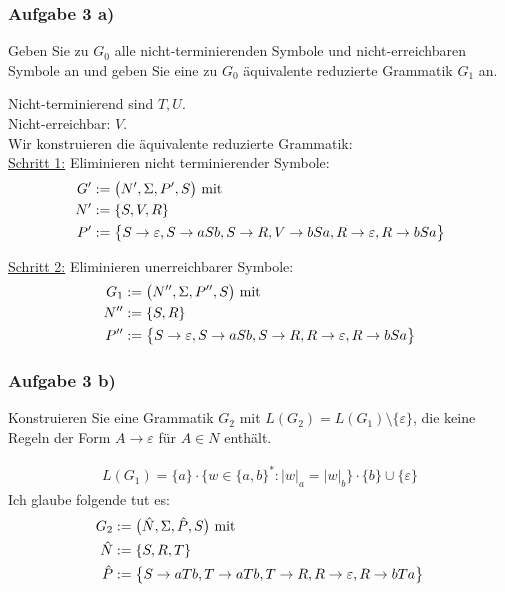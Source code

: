 \subsubsection{Aufgabe 3 a)}
Geben Sie zu $G_0$ alle nicht-terminierenden Symbole und nicht-erreichbaren Symbole an und geben Sie eine zu $G_0$ äquivalente reduzierte Grammatik $G_1$ an.

\begin{lösung}
	Nicht-terminierend sind $T,U$.\\
	Nicht-erreichbar: $V$.\\
	Wir konstruieren die äquivalente reduzierte Grammatik:\\
	\underline{Schritt 1:} Eliminieren nicht terminierender Symbole:
	\begin{align*}
		G'&:=\big(N',\Sigma,P',S\big)\mit\\
		N'&:=\lbrace S,V,R\rbrace\\
		P'&:=\big\lbrace
			S\to\varepsilon, S\to aSb,S\to R,V\to bSa,R\to\varepsilon,R\to bSa
		\big\rbrace
	\end{align*}
	
	\underline{Schritt 2:} Eliminieren unerreichbarer Symbole:
	\begin{align*}
		G_1&:=\big(N'',\Sigma,P'',S\big)\mit\\
		N''&:=\lbrace S,R\rbrace\\
		P''&:=\big\lbrace
			S\to\varepsilon, S\to aSb,S\to R,R\to\varepsilon,R\to bSa
		\big\rbrace
	\end{align*}
\end{lösung}

\subsubsection{Aufgabe 3 b)}
Konstruieren Sie eine Grammatik $G_2$ mit $L(G_2)=L(G_1)\setminus\lbrace\varepsilon\rbrace$, die keine Regeln der Form $A\to\varepsilon$ für $A\in N$ enthält.

\begin{lösung}
	\begin{align*}
		L(G_1)=\lbrace a\rbrace\cdot\big\lbrace w\in\lbrace a,b\rbrace^\ast:|w|_a=|w|_b\big\rbrace\cdot\lbrace b\rbrace\cup\lbrace\varepsilon\rbrace
	\end{align*}
	Ich glaube folgende tut es:
	\begin{align*}
		G_2&:=\big(\hat{N},\Sigma,\hat{P},S\big)\mit\\
		\hat{N}&:=\lbrace S,R,T\rbrace\\
		\hat{P}&:=\big\lbrace
			S\to aTb, T\to aTb,T\to R,R\to\varepsilon,R\to bTa
		\big\rbrace
	\end{align*}
\end{lösung}


